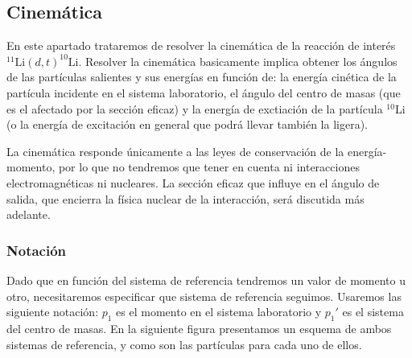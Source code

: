\subsection{Cinemática} \label{Subsec:03-cinematica}

En este apartado trataremos de resolver la cinemática de la reacción de interés $^{11}\text{Li}(d,t)^{10}\text{Li}$. Resolver la cinemática basicamente implica obtener los ángulos de las partículas salientes y sus energías en función de: la energía cinética de la partícula incidente en el sistema laboratorio, el ángulo del centro de masas (que es el afectado por la sección eficaz) y la energía de exctiación de la partícula $^{10}$Li (o la energía de excitación en general que podrá llevar también la ligera).

La cinemática responde únicamente a las leyes de conservación de la energía-momento, por lo que no tendremos que tener en cuenta ni interacciones electromagnéticas ni nucleares. La sección eficaz que influye en el ángulo de salida, que encierra la física nuclear de la interacción, será discutida más adelante.

\subsubsection{Notación}
Dado que en función del sistema de referencia tendremos un valor de momento u otro, necesitaremos especificar que sistema de referencia seguimos. Usaremos las siguiente notación: $p_{1}$ es el momento en el sistema laboratorio y $p_{1}'$ es el sistema del centro de masas. En la siguiente figura presentamos un esquema de ambos sistemas de referencia, y como son las partículas para cada uno de ellos.

